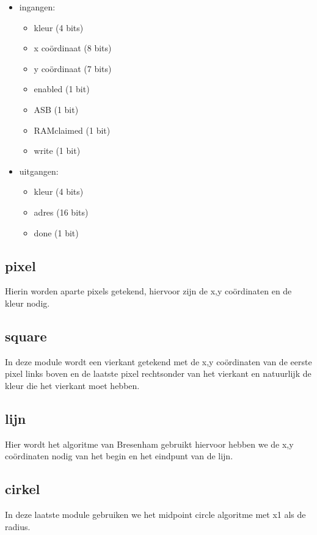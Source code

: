 \documentclass{scrreprt} %
\begin{document}
\begin {itemize}
\item ingangen:
\begin {itemize}
\item kleur (4 bits)
\item x coördinaat (8 bits)
\item y coördinaat (7 bits)
\item enabled (1 bit)
\item ASB (1 bit)
\item RAMclaimed (1 bit)
\item write (1 bit)
\end {itemize}

\item uitgangen:
\begin {itemize}
\item kleur (4 bits)
\item adres (16 bits)
\item done (1 bit)
\end {itemize}
\end{itemize}

\subsection { pixel}
Hierin worden aparte pixels getekend, hiervoor zijn de x,y coördinaten en de kleur nodig.

\subsection { square}
In deze module wordt een vierkant getekend met de x,y coördinaten van de eerste pixel links boven en de laatste pixel rechtsonder van het vierkant en natuurlijk de kleur die het vierkant moet hebben.

\subsection { lijn}
Hier wordt het algoritme van Bresenham gebruikt hiervoor hebben we de x,y coördinaten nodig van het begin en het eindpunt van de lijn.

\subsection { cirkel}
In deze laatste module gebruiken we het midpoint circle algoritme met x1 als de radius.
\end{document}
